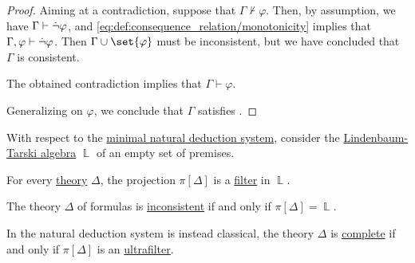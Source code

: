 \begin{proof}
  Aiming at a contradiction, suppose that \( \Gamma \not\vdash \varphi \). Then, by assumption, we have \( \Gamma \vdash \dot{\neg} \varphi \), and \eqref{eq:def:consequence_relation/monotonicity} implies that \( \Gamma, \varphi \vdash \dot{\neg} \varphi \). Then \( \Gamma \cup \set{ \varphi } \) must be inconsistent, but we have concluded that \( \Gamma \) is consistent.

  The obtained contradiction implies that \( \Gamma \vdash \varphi \).

  Generalizing on \( \varphi \), we conclude that \( \Gamma \) satisfies .
\end{proof}

\begin{proposition}\label{thm:lindenbaum_tarski_theories}
  With respect to the \hyperref[def:propositional_natural_deduction_systems]{minimal natural deduction system}, consider the \hyperref[def:lindenbaum_tarski_algebra]{Lindenbaum-Tarski algebra} \( \BbbL \) of an empty set of premises.

  \begin{thmenum}
     For every \hyperref[def:logical_theory]{theory} \( \Delta \), the projection \( \pi[\Delta] \) is a \hyperref[def:lattice_ideal]{filter} in \( \BbbL \).

     The theory \( \Delta \) of formulas is \hyperref[def:consistent_set_of_sentences]{inconsistent} if and only if \( \pi[\Delta] = \BbbL \).

     In the natural deduction system is instead classical, the theory \( \Delta \) is \hyperref[def:complete_set_of_sentences]{complete} if and only if \( \pi[\Delta] \) is an \hyperref[def:ultrafilter]{ultrafilter}.
  \end{thmenum}
\end{proposition}
